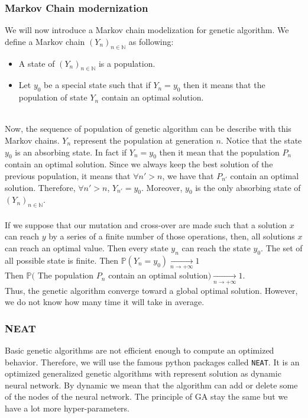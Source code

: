 \documentclass[11pt,a4paper]{article}
\newcommand{\tab}{\phantom{xxx}}
\newcommand{\mlist}[1]{\begin{itemize}[noitemsep,topsep=0pt]#1\end{itemize}}
\begin{document}
			\subsubsection*{Markov Chain modernization}
We will now introduce a Markov chain modelization for genetic algorithm. We define a Markov chain $(Y_n)_{n\in\mathbb{N}}$ as following:
\mlist{
\item A state of $(Y_n)_{n\in\mathbb{N}}$ is a population.
\item Let $y_0$ be a special state such that if $Y_n = y_0$ then it means that the population of state $Y_n$ contain an optimal solution.
}
\tab \\
Now, the sequence of population of genetic algorithm can be describe with this Markov chains. $Y_n$ represent the population at generation $n$. Notice that the state $y_0$ is an absorbing state. In fact if $Y_n = y_0$ then it mean that the population $P_n$ contain an optimal solution. Since we always keep the best solution of the previous population, it means that $\forall n'>n$, we have that $P_{n'}$ contain an optimal solution. Therefore, $\forall n'>n$, $Y_{n'} = y_0$. Moreover, $y_0$ is the only absorbing state of $(Y_n)_{n\in\mathbb{N}}$.\\
\\
If we suppose that our mutation and cross-over are made such that a solution $x$ can reach $y$ by a series of a finite number of those operations, then, all solutions $x$ can reach an optimal value. Then every state $y_n$ can reach the state $y_0$. The set of all possible state is finite. Then $\mathbb{P}(Y_n = y_0) \underset{n \rightarrow +\infty}{\rightarrow} 1$\\
Then $\mathbb{P}($ The population $P_n$ contain an optimal solution$) \underset{n \rightarrow +\infty}{\rightarrow} 1$.\\
Thus, the genetic algorithm converge toward a global optimal solution. However, we do not know how many time it will take in average.
		
			\subsubsection*{NEAT}
Basic genetic algorithms are not efficient enough to compute an optimized behavior. Therefore, we will use the famous python packages called \texttt{NEAT}. It is an optimized generalized genetic algorithms with represent solution as dynamic neural network. By dynamic we mean that the algorithm can add or delete some of the nodes of the neural network. The principle of GA stay the same but we have a lot more hyper-parameters.
	
\end{document}
